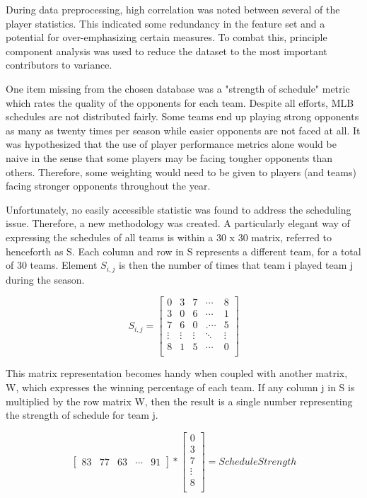 \documentclass{article} %
\begin{document}
During data preprocessing, high correlation was noted between several of the player statistics.  This indicated some redundancy in the feature set and a potential for over-emphasizing certain measures.  To combat this, principle component analysis was used to reduce the dataset to the most important contributors to variance.  

One item missing from the chosen database was a "strength of schedule" metric which rates the quality of the opponents for each team.  Despite all efforts, MLB schedules are not distributed fairly.  Some teams end up playing strong opponents as many as twenty times per season while easier opponents are not faced at all. It was hypothesized that the use of player performance metrics alone would be naive in the sense that some players may be facing tougher opponents than others. Therefore, some weighting would need to be given to players (and teams) facing stronger opponents throughout the year.

Unfortunately, no easily accessible statistic was found to address the scheduling issue.  Therefore, a new methodology was created. A particularly elegant way of expressing the schedules of all teams is within a 30 x 30 matrix, referred to henceforth as S.  Each column and row in S represents a different team, for a total of 30 teams.  Element $S_{i,j}$ is then the number of times that team i played team j during the season.    

 \[S_{i,j} = \begin{bmatrix}
0 & 3 & 7 & \cdots & 8\\
3 & 0 & 6 & \cdots & 1 \\
7 & 6 & 0 & .\cdots & 5 \\
\vdots & \vdots & \vdots & \ddots & \vdots \\
8 & 1 & 5 & \cdots & 0 \\
 \end{bmatrix}
 \]

This matrix representation becomes handy when coupled with another matrix, W, which expresses the winning percentage of each team.  If any column j in S is multiplied by the row matrix W, then the result is a single number representing the strength of schedule for team j.

\[
\begin{bmatrix}
83 & 77 & 63 & \cdots & 91
\end{bmatrix}
*
\begin{bmatrix}
0 \\
3 \\
7 \\
\vdots \\
8 \\
\end{bmatrix}
= Schedule Strength
\]
\end{document}
